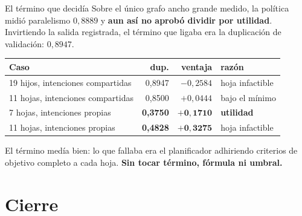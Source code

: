 \documentclass[10pt,aspectratio=169]{beamer}
\begin{document}
\begin{frame}{El término que decidía}
  Sobre el único grafo ancho grande medido, la política midió paralelismo
  $0{,}8889$ y \textbf{aun así no aprobó dividir por utilidad}. Invirtiendo la
  salida registrada, el término que ligaba era la duplicación de validación:
  $0{,}8947$.

  \bigskip
  \pause
  \small
  \begin{center}
  \begin{tabular}{lrrl}
    \toprule
    \textbf{Caso} & \textbf{dup.} & \textbf{ventaja} & \textbf{razón} \\
    \midrule
    19 hijos, intenciones compartidas & 0,8947 & $-0{,}2584$ & hoja infactible \\
    11 hojas, intenciones compartidas & 0,8500 & $+0{,}0444$ & bajo el mínimo \\
    7 hojas, intenciones propias & \textbf{0,3750} & $\mathbf{+0{,}1710}$ & \textbf{utilidad} \\
    11 hojas, intenciones propias & \textbf{0,4828} & $\mathbf{+0{,}3275}$ & hoja infactible \\
    \bottomrule
  \end{tabular}
  \end{center}

  \bigskip
  \normalsize
  \pause
  El término medía bien: lo que fallaba era el planificador adhiriendo criterios
  de objetivo completo a cada hoja. \textbf{Sin tocar término, fórmula ni
  umbral.}
\end{frame}

\section{Cierre}
\end{document}
